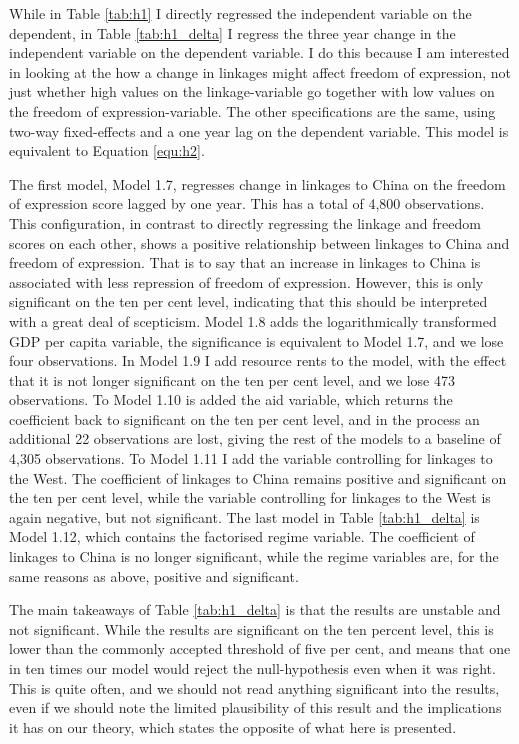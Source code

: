 While in Table \ref{tab:h1} I directly regressed the independent variable on the dependent, in Table \ref{tab:h1_delta} I regress the three year change in the independent variable on the dependent variable. I do this because I am interested in looking at the how a change in linkages might affect freedom of expression, not just whether high values on the linkage-variable go together with low values on the freedom of expression-variable. The other specifications are the same, using two-way fixed-effects and a one year lag on the dependent variable. This model is equivalent to Equation \ref{equ:h2}.

The first model, Model 1.7, regresses change in linkages to China on the freedom of expression score lagged by one year. This has a total of 4,800 observations. This configuration, in contrast to directly regressing the linkage and freedom scores on each other, shows a positive relationship between linkages to China and freedom of expression. That is to say that an increase in linkages to China is associated with less repression of freedom of expression. However, this is only significant on the ten per cent level, indicating that this should be interpreted with a great deal of scepticism. Model 1.8 adds the logarithmically transformed GDP per capita variable, the significance is equivalent to Model 1.7, and we lose four observations. In Model 1.9 I add resource rents to the model, with the effect that it is not longer significant on the ten per cent level, and we lose 473 observations. To Model 1.10 is added the aid variable, which returns the coefficient back to significant on the ten per cent level, and in the process an additional 22 observations are lost, giving the rest of the models to a baseline of 4,305 observations. To Model 1.11 I add the variable controlling for linkages to the West. The coefficient of linkages to China remains positive and significant on the ten per cent level, while the variable controlling for linkages to the West is again negative, but not significant. The last model in Table \ref{tab:h1_delta} is Model 1.12, which contains the factorised regime variable. The coefficient of linkages to China is no longer significant, while the regime variables are, for the same reasons as above, positive and significant.

The main takeaways of Table \ref{tab:h1_delta} is that the results are unstable and not significant. While the results are significant on the ten percent level, this is lower than the commonly accepted threshold of five per cent, and means that one in ten times our model would reject the null-hypothesis even when it was right. This is quite often, and we should not read anything significant into the results, even if we should note the limited plausibility of this result and the implications it has on our theory, which states the opposite of what here is presented.


